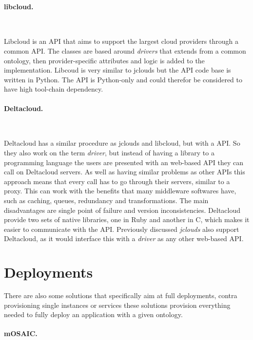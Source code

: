 \paragraph{libcloud.}~\cite{libcloud}

Libcloud is an API that aims to support the largest cloud providers through a common API. 
The classes are based around \emph{drivers} that extends from a common ontology, 
then provider-specific attributes and logic is added to the implementation.
Libcoud is very similar to jclouds but the API code base is written in Python. 
The API is Python-only and could therefor be considered to have high tool-chain dependency.

\paragraph{Deltacloud.}~\cite{deltacloud}

Deltacloud has a similar procedure as jclouds and libcloud, but with a  API. 
So they also work on the term \emph{driver}, but instead of having a library to a 
programming language the users are presented with an web-based API they can call
on Deltacloud servers. 
As well as having similar problems as other APIs this approach means 
that every call has to go through their servers, similar to a proxy. 
This can work with the benefits that many middleware softwares have, such as caching, queues, 
redundancy and transformations.
The main disadvantages are single point of failure and version inconsistencies.
Deltacloud provide two sets of native libraries, one in Ruby and another in C, which
makes it easier to communicate with the  API.
Previously discussed \emph{jclouds} also support Deltacloud, as it would interface this
with a \emph{driver} as any other web-based API.

\section{Deployments}

There are also some solutions that specifically aim at full deployments,
contra provisioning single instances or services these solutions
provision everything needed to fully deploy an application with a given ontology.

\paragraph{mOSAIC.}~\cite{portable:petcu12} 

